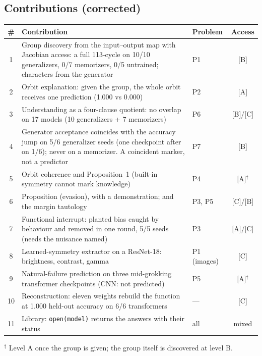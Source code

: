 \documentclass[11pt]{article}
\newcommand{\lev}[1]{\textsc{[#1]}}%
\begin{document}
\subsection{Contributions (corrected)}
\begin{table}[h]\centering\small
\begin{tabular}{@{}cp{8.2cm}lc@{}}
\toprule
\# & Contribution & Problem & Access\\\midrule
1 & Group discovery from the input--output map with Jacobian access: a full 113-cycle on 10/10 generalizers, 0/7 memorizers, 0/5 untrained; characters from the generator & P1 & \lev{B}\\
2 & Orbit explanation: given the group, the whole orbit receives one prediction (1.000 vs 0.000) & P2 & \lev{A}\\
3 & Understanding as a four-clause quotient: no overlap on 17 models (10 generalizers + 7 memorizers) & P6 & \lev{B}/\lev{C}\\
4 & Generator acceptance coincides with the accuracy jump on 5/6 generalizer seeds (one checkpoint after on 1/6); never on a memorizer. A coincident marker, not a predictor & P7 & \lev{B}\\
5 & Orbit coherence and Proposition~1 (built-in symmetry cannot mark knowledge) & P4 & \lev{A}$^\dagger$\\
6 & Proposition (evasion), with a demonstration; and the margin tautology & P3, P5 & \lev{C}/\lev{B}\\
7 & Functional interrupt: planted bias caught by behaviour and removed in one round, 5/5 seeds (needs the nuisance named) & P3 & \lev{A}/\lev{C}\\
8 & Learned-symmetry extractor on a ResNet-18: brightness, contrast, gamma & P1 (images) & \lev{C}\\
9 & Natural-failure prediction on three mid-grokking transformer checkpoints (CNN: not predicted) & P5 & \lev{A}$^\dagger$\\
10 & Reconstruction: eleven weights rebuild the function at 1.000 held-out accuracy on 6/6 transformers & --- & \lev{C}\\
11 & Library: \texttt{open(model)} returns the answers with their status & all & mixed\\\bottomrule
\end{tabular}

\smallskip\footnotesize $^\dagger$ Level A once the group is given; the group itself is discovered at level B.
\end{table}
\end{document}
